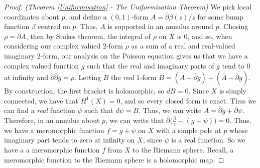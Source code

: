 \documentclass[11pt]{report}
\theoremstyle{definition}
\begin{document}
\begin{proof} \emph{(Theorem \ref{Uniformisation} - The Uniformisation Theorem)}
We pick local coordinates about $p$, and define a $(0,1)$-form $A=\overline{\partial}\beta(z)/z$ for some bump function $\beta$ centred on $p$. Thus, $A$ is supported in an annulus around $p$. Chosing $\rho = \partial A$, then by Stokes theorem, the integral of $\rho$ on $X$ is $0$, and so, when considering our complex valued $2$-form $\rho$ as a sum of a real and real-valued imaginary $2$-form, our analysis on the Poisson equation gives us that we have a complex valued function $g$ such that the real and imaginary parts of $g$ tend to $0$ at infinity and $\partial\overline{\partial}g = \rho$. Letting $B$ the \emph{real} $1$-form $B=(A-\overline{\partial}g)+(\overline{A} - \overline{\overline{\partial}g})$. By construction, the first bracket is holomorphic, so $dB = 0$. Since $X$ is simply connected, we have that $H^1(X)=0$, and so every closed form is exact. Thus we can find a \emph{real} function $\psi$ such that $d\psi = B$. Thus, we can write $A = \overline{\partial}g + \overline{\partial}\psi$. Therefore, in an annulus about $p$, we can write that $\overline{\partial}\Big(\frac{\beta}{z} - (g+\psi)\Big) = 0$. Thus, we have a meromorphic function $f = g + \psi$ on $X$ with a simple pole at $p$ whose imaginary part tends to zero at infinity on $X$, since $\psi$ is a real function. So we have a a meromorphic function $f$ from $X$ to the Riemann sphere. Recall, a meromorphic function to the Riemann sphere is a holomorphic map. 


\end{proof}
\end{document}

